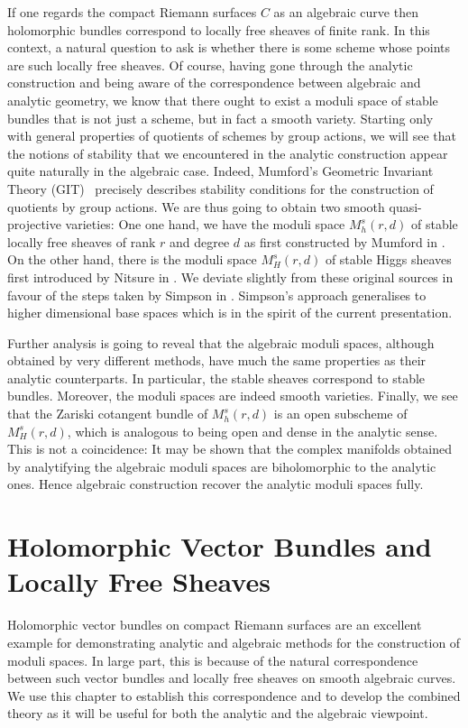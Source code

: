 \documentclass[12pt]{ociamthesis}  %
\begin{document}
If one regards the compact Riemann surfaces $C$ as an algebraic curve
then holomorphic bundles correspond to locally free sheaves of finite
rank. In this context, a natural question to ask is whether there is
some scheme whose points are such locally free sheaves. Of course,
having gone through the analytic construction and being aware of
the correspondence between algebraic and analytic geometry, we know
that there ought to exist a moduli space of stable bundles that is not
just a scheme, but in fact a smooth variety. Starting only with
general properties of quotients of schemes by group actions, we will
see that the notions of stability that we encountered in the analytic
construction appear quite naturally in the algebraic case. Indeed,
Mumford's Geometric Invariant Theory (GIT)~\cite{mumford1994}
precisely describes stability conditions for the construction of quotients
by group actions.
We are thus going to obtain two smooth quasi-projective varieties:
One one hand, we have the moduli space $M^s_h(r,d)$ of stable locally free sheaves of
rank $r$ and degree $d$ as first constructed by Mumford in
\cite{mumford1963}. On the other hand, there is the moduli space
$M^s_H(r,d)$ of stable Higgs sheaves first introduced by Nitsure in
\cite{nitsure1991}. We deviate slightly from these original sources
in favour of the steps taken by Simpson in \cite{simpson1994}. Simpson's
approach generalises to higher dimensional base spaces which is in the
spirit of the current presentation.

Further analysis is going to reveal that the algebraic moduli spaces,
although obtained by very different methods, have much the same
properties as their analytic counterparts. In particular, the stable
sheaves correspond to stable bundles. Moreover, the moduli spaces
are indeed smooth varieties. Finally, we see that the Zariski cotangent
bundle of $M^s_h(r,d)$ is an open subscheme of $M^s_H(r,d)$, which
is analogous to being open and dense in the analytic sense. This is
not a coincidence: It may be shown that the complex manifolds obtained
by analytifying the algebraic moduli spaces are biholomorphic to
the analytic ones. Hence algebraic construction recover the analytic
moduli spaces fully.

\chapter{Holomorphic Vector Bundles and Locally Free Sheaves}

Holomorphic vector bundles on compact Riemann surfaces are an excellent
example for demonstrating analytic and algebraic methods for 
the construction of moduli spaces. In large part, this is because
of the natural correspondence between such vector bundles and
locally free sheaves on smooth algebraic curves. We use this
chapter to establish this correspondence and to develop the combined
theory as it will be useful for both the analytic and the algebraic
viewpoint.
\end{document}
